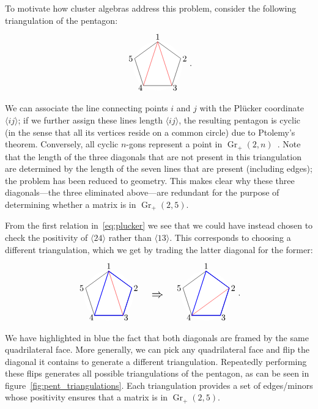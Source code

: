 \documentclass[11pt]{article}
\DeclareMathOperator{\Gr}{Gr}
\def\ket#1{\langle #1 \rangle}
\def\drawLabeledPentagon{
\coordinate (P1) at (90:1);
\coordinate (P2) at (18:1);
\coordinate (P3) at (306:1);
\coordinate (P4) at (234:1);
\coordinate (P5) at (162:1);
\draw[white,fill=white] (0,0) circle (1cm);
\draw (P1) -- (P2) -- (P3) -- (P4) -- (P5) -- cycle;
\draw (0,1.2) node {1};
\draw (.9,.3) node[anchor=west] {2};
\draw (.5,-.9) node[anchor=west] {3};
\draw (-.5,-.9) node[anchor=east] {4};
\draw (-.9,.3) node[anchor=east] {5};
}
\begin{document}
To motivate how cluster algebras address this problem, consider the following triangulation of the pentagon:
\begin{equation} \label{eq:pent_triangulation}
\begin{gathered}
\begin{tikzpicture}
  \drawLabeledPentagon
  \draw[color=red] (P1) -- (P3);
  \draw[color=red] (P1) -- (P4);
\end{tikzpicture} 
\end{gathered} .
\end{equation}
We can associate the line connecting points $i$ and $j$ with the Pl\"ucker coordinate $\ket{ij}$; if we further assign these lines length $\ket{ij}$, the resulting pentagon is cyclic (in the sense that all its vertices reside on a common circle) due to Ptolemy's theorem. Conversely, all cyclic $n$-gons represent a point in $\Gr_+(2,n)$~\cite{Arkani-Hamed:2014bca}. Note that the length of the three diagonals that are not present in this triangulation are determined by the length of the seven lines that are present (including edges); the problem has been reduced to geometry. This makes clear why these three diagonals---the three eliminated above---are redundant for the purpose of determining whether a matrix is in $\Gr_+(2,5)$. 

From the first relation in~\eqref{eq:plucker} we see that we could have instead chosen to check the positivity of $\ket{24}$ rather than $\ket{13}$. This corresponds to choosing a different triangulation, which we get by trading the latter diagonal for the former:
\begin{equation}
\begin{gathered}
\begin{tikzpicture}
  \drawLabeledPentagon
  \draw[color=blue, thick] (P1) -- (P2) -- (P3) -- (P4) -- cycle;
  \draw[color=red] (P1) -- (P3);
  \draw (2,0) node {\scalebox{1.4}{$\Rightarrow$}};
\begin{scope}[xshift = 4cm]
  \drawLabeledPentagon
  \draw[color=blue, thick] (P1) -- (P2) -- (P3) -- (P4) -- cycle;
  \draw[color=red] (P2) -- (P4); 
\end{scope}
\end{tikzpicture}
\end{gathered}.  
\end{equation}
We have highlighted in blue the fact that both diagonals are framed by the same quadrilateral face. More generally, we can pick any quadrilateral face and flip the diagonal it contains to generate a different triangulation. Repeatedly performing these flips generates all possible triangulations of the pentagon, as can be seen in figure~\ref{fig:pent_triangulations}. Each triangulation provides a set of edges/minors whose positivity ensures that a matrix is in $\Gr_+(2,5)$. 
\end{document}
